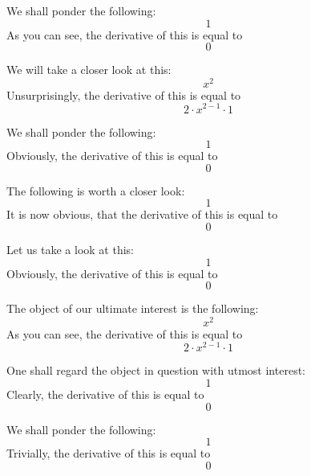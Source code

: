 \documentclass{article}
\begin{document}
We shall ponder the following:
\begin{equation}
1 
\end{equation}
As you can see, the derivative of this is equal to
\begin{equation}
0 
\end{equation}

We will take a closer look at this:
\begin{equation}
x ^{2 } 
\end{equation}
Unsurprisingly, the derivative of this is equal to
\begin{equation}
2 \cdot x ^{2 - 1 } \cdot 1 
\end{equation}

We shall ponder the following:
\begin{equation}
1 
\end{equation}
Obviously, the derivative of this is equal to
\begin{equation}
0 
\end{equation}

The following is worth a closer look:
\begin{equation}
1 
\end{equation}
It is now obvious, that the derivative of this is equal to
\begin{equation}
0 
\end{equation}

Let us take a look at this:
\begin{equation}
1 
\end{equation}
Obviously, the derivative of this is equal to
\begin{equation}
0 
\end{equation}

The object of our ultimate interest is the following:
\begin{equation}
x ^{2 } 
\end{equation}
As you can see, the derivative of this is equal to
\begin{equation}
2 \cdot x ^{2 - 1 } \cdot 1 
\end{equation}

One shall regard the object in question with utmost interest:
\begin{equation}
1 
\end{equation}
Clearly, the derivative of this is equal to
\begin{equation}
0 
\end{equation}

We shall ponder the following:
\begin{equation}
1 
\end{equation}
Trivially, the derivative of this is equal to
\begin{equation}
0 
\end{equation}
\end{document}
